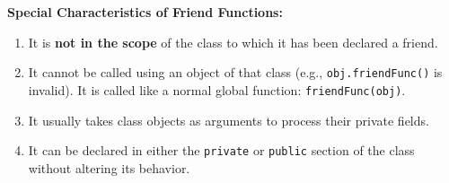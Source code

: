 \documentclass[12pt,a4paper]{article}
\begin{document}
\textbf{Special Characteristics of Friend Functions:}
\begin{enumerate}[label=\textbf{\alph*.}, leftmargin=1.5em, itemsep=2pt]
  \item It is \textbf{not in the scope} of the class to which it has been declared a friend.
  \item It cannot be called using an object of that class (e.g., \texttt{obj.friendFunc()} is invalid). It is called like a normal global function: \texttt{friendFunc(obj)}.
  \item It usually takes class objects as arguments to process their private fields.
  \item It can be declared in either the \texttt{private} or \texttt{public} section of the class without altering its behavior.
\end{enumerate}
\end{document}

